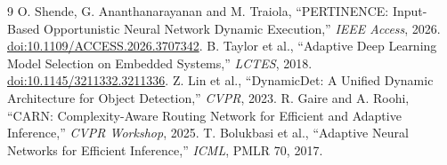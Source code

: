 \documentclass[10pt,a4paper]{article}
\begin{document}
\vspace{-0.5em}
\begin{thebibliography}{9}\footnotesize\setlength{\itemsep}{0pt}
 O. Shende, G. Ananthanarayanan and M. Traiola, ``PERTINENCE: Input-Based Opportunistic Neural Network Dynamic Execution,'' \emph{IEEE Access}, 2026. \href{https://doi.org/10.1109/ACCESS.2026.3707342}{doi:10.1109/ACCESS.2026.3707342}.
 B. Taylor et al., ``Adaptive Deep Learning Model Selection on Embedded Systems,'' \emph{LCTES}, 2018. \href{https://doi.org/10.1145/3211332.3211336}{doi:10.1145/3211332.3211336}.
 Z. Lin et al., ``DynamicDet: A Unified Dynamic Architecture for Object Detection,'' \emph{CVPR}, 2023.
 R. Gaire and A. Roohi, ``CARN: Complexity-Aware Routing Network for Efficient and Adaptive Inference,'' \emph{CVPR Workshop}, 2025.
 T. Bolukbasi et al., ``Adaptive Neural Networks for Efficient Inference,'' \emph{ICML}, PMLR 70, 2017.
\end{thebibliography}
\end{document}
